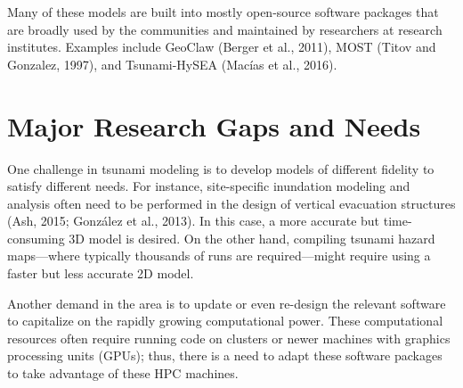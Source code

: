 Many of these models are built into mostly open-source software packages that are broadly used by the communities and maintained by researchers at research institutes. Examples include GeoClaw (Berger et al., 2011), MOST (Titov and Gonzalez, 1997), and Tsunami-HySEA (Macías et al., 2016).

\section{Major Research Gaps and Needs}
\label{sec:tsunami_gaps}

One challenge in tsunami modeling is to develop models of different fidelity to satisfy different needs. For instance, site-specific inundation modeling and analysis often need to be performed in the design of vertical evacuation structures (Ash, 2015; González et al., 2013). In this case, a more accurate but time-consuming 3D model is desired. On the other hand, compiling tsunami hazard maps—where typically thousands of runs are required—might require using a faster but less accurate 2D model.

Another demand in the area is to update or even re-design the relevant software to capitalize on the rapidly growing computational power. These computational resources often require running code on clusters or newer machines with graphics processing units (GPUs); thus, there is a need to adapt these software packages to take advantage of these HPC machines.

%
